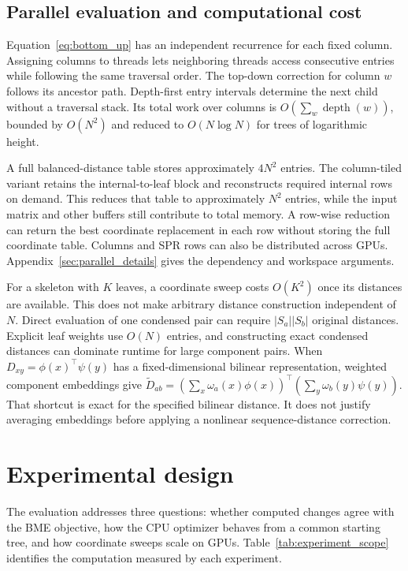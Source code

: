 \documentclass[11pt,a4paper]{article}
\makeatletter
\DeclareRobustCommand{\_}{\ifmmode\nfss@text{\textunderscore}\else\textunderscore\allowbreak\fi}
\theoremstyle{definition}
\makeatother
\begin{document}
\subsection{Parallel evaluation and computational cost}
\label{sec:parallel}

Equation~\eqref{eq:bottom_up} has an independent recurrence for each fixed column.
Assigning columns to threads lets neighboring threads access consecutive entries while following the same traversal order.
The top-down correction for column $w$ follows its ancestor path.
Depth-first entry intervals determine the next child without a traversal stack.
Its total work over columns is $O(\sum_w\operatorname{depth}(w))$, bounded by $O(N^2)$ and reduced to $O(N\log N)$ for trees of logarithmic height.

A full balanced-distance table stores approximately $4N^2$ entries.
The column-tiled variant retains the internal-to-leaf block and reconstructs required internal rows on demand.
This reduces that table to approximately $N^2$ entries, while the input matrix and other buffers still contribute to total memory.
A row-wise reduction can return the best coordinate replacement in each row without storing the full coordinate table.
Columns and SPR rows can also be distributed across GPUs.
Appendix~\ref{sec:parallel_details} gives the dependency and workspace arguments.

For a skeleton with $K$ leaves, a coordinate sweep costs $O(K^2)$ once its distances are available.
This does not make arbitrary distance construction independent of $N$.
Direct evaluation of one condensed pair can require $|S_a||S_b|$ original distances.
Explicit leaf weights use $O(N)$ entries, and constructing exact condensed distances can dominate runtime for large component pairs.
When $D_{xy}=\phi(x)^\top\psi(y)$ has a fixed-dimensional bilinear representation, weighted component embeddings give
$\widetilde D_{ab}=(\sum_x\omega_a(x)\phi(x))^\top
(\sum_y\omega_b(y)\psi(y))$.
That shortcut is exact for the specified bilinear distance.
It does not justify averaging embeddings before applying a nonlinear sequence-distance correction.

\section{Experimental design}
\label{sec:experiments}

The evaluation addresses three questions: whether computed changes agree with the BME objective, how the CPU optimizer behaves from a common starting tree, and how coordinate sweeps scale on GPUs.
Table~\ref{tab:experiment_scope} identifies the computation measured by each experiment.
\end{document}
